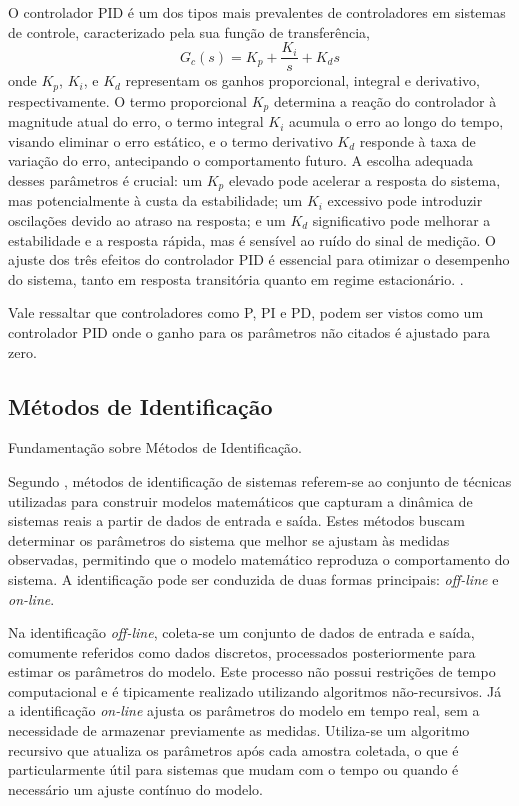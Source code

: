 O controlador PID é um dos tipos mais prevalentes de controladores em sistemas de controle, caracterizado pela sua
função de transferência,
\begin{equation}
\label{eq:ctrlr}
G_c(s) = K_p + \frac{K_i}{s} + K_d s
\end{equation}
onde \( K_p \), \( K_i \), e \( K_d \) representam os ganhos proporcional, integral e derivativo, respectivamente.
O termo proporcional \( K_p \) determina a reação do controlador à magnitude atual do erro,
o termo integral \( K_i \) acumula o erro ao longo do tempo, visando eliminar o erro estático,
e o termo derivativo \( K_d \) responde à taxa de variação do erro, antecipando o comportamento futuro.
A escolha adequada desses parâmetros é crucial: um \( K_p \) elevado pode acelerar a resposta do sistema, mas
potencialmente à custa da estabilidade;
um \( K_i \) excessivo pode introduzir oscilações devido ao atraso na resposta;
e um \( K_d \) significativo pode melhorar a estabilidade e a resposta rápida, mas é sensível ao ruído do sinal de
medição.
O ajuste dos três efeitos do controlador PID é essencial para otimizar o desempenho do sistema, tanto em resposta
transitória quanto em regime estacionário. \cite[Cap 2.3 e 8]{ogata2010engenharia}.

Vale ressaltar que controladores como P, PI e PD, podem ser vistos como um controlador PID onde o ganho para os
parâmetros não citados é ajustado para zero.

\subsection{Métodos de Identificação}

Fundamentação sobre Métodos de Identificação.

Segundo \cite[Cap 2]{CoelhoIdentificacao}, métodos de identificação de sistemas referem-se ao conjunto de técnicas
utilizadas para construir modelos matemáticos que capturam a dinâmica de sistemas reais a partir de dados de entrada e
saída.
Estes métodos buscam determinar os parâmetros do sistema que melhor se ajustam às medidas observadas,
permitindo que o modelo matemático reproduza o comportamento do sistema.
A identificação pode ser conduzida de duas formas principais: \textit{off-line} e \textit{on-line}.

Na identificação \textit{off-line}, coleta-se um conjunto de dados de entrada e saída, comumente referidos como dados discretos,
processados posteriormente para estimar os parâmetros do modelo.
Este processo não possui restrições de tempo computacional e é tipicamente realizado utilizando algoritmos
não-recursivos.
Já a identificação \textit{on-line} ajusta os parâmetros do modelo em tempo real, sem a necessidade de armazenar previamente as
medidas.
Utiliza-se um algoritmo recursivo que atualiza os parâmetros após cada amostra coletada,
o que é particularmente útil para sistemas que mudam com o tempo ou quando é necessário um ajuste contínuo do modelo.

